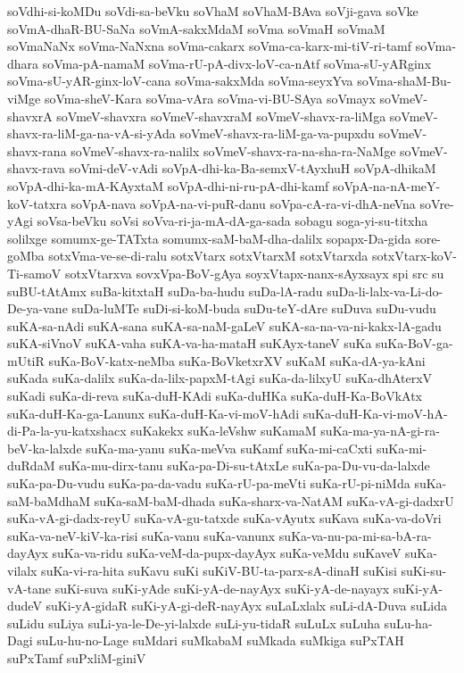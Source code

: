 {soVdhi-si-koMDu
soVdi-sa-beVku
soVhaM
soVhaM-BAva
soVji-gava
soVke
soVmA-dhaR-BU-SaNa
soVmA-sakxMdaM
soVma
soVmaH
soVmaM
soVmaNaNx
soVma-NaNxna
soVma-cakarx
soVma-ca-karx-mi-tiV-ri-tamf
soVma-dhara
soVma-pA-namaM
soVma-rU-pA-divx-loV-ca-nAtf
soVma-sU-yARginx
soVma-sU-yAR-ginx-loV-cana
soVma-sakxMda
soVma-seyxYva
soVma-shaM-Bu-viMge
soVma-sheV-Kara
soVma-vAra
soVma-vi-BU-SAya
soVmayx
soVmeV-shavxrA
soVmeV-shavxra
soVmeV-shavxraM
soVmeV-shavx-ra-liMga
soVmeV-shavx-ra-liM-ga-na-vA-si-yAda
soVmeV-shavx-ra-liM-ga-va-pupxdu
soVmeV-shavx-rana
soVmeV-shavx-ra-nalilx
soVmeV-shavx-ra-na-sha-ra-NaMge
soVmeV-shavx-rava
soVmi-deV-vAdi
soVpA-dhi-ka-Ba-semxV-tAyxhuH
soVpA-dhikaM
soVpA-dhi-ka-mA-KAyxtaM
soVpA-dhi-ni-ru-pA-dhi-kamf
soVpA-na-nA-meY-koV-tatxra
soVpA-nava
soVpA-na-vi-puR-danu
soVpa-cA-ra-vi-dhA-neVna
soVre-yAgi
soVsa-beVku
soVsi
soVva-ri-ja-mA-dA-ga-sada
sobagu
soga-yi-su-titxha
solilxge
somumx-ge-TATxta
somumx-saM-baM-dha-dalilx
sopapx-Da-gida
sore-goMba
sotxVma-ve-se-di-ralu
sotxVtarx
sotxVtarxM
sotxVtarxda
sotxVtarx-koV-Ti-samoV
sotxVtarxva
sovxVpa-BoV-gAya
soyxVtapx-nanx-sAyxsayx
spi
src
su
suBU-tAtAmx
suBa-kitxtaH
suDa-ba-hudu
suDa-lA-radu
suDa-li-lalx-va-Li-do-De-ya-vane
suDa-luMTe
suDi-si-koM-buda
suDu-teY-dAre
suDuva
suDu-vudu
suKA-sa-nAdi
suKA-sana
suKA-sa-naM-gaLeV
suKA-sa-na-va-ni-kakx-lA-gadu
suKA-siVnoV
suKA-vaha
suKA-va-ha-mataH
suKAyx-taneV
suKa
suKa-BoV-ga-mUtiR
suKa-BoV-katx-neMba
suKa-BoVketxrXV
suKaM
suKa-dA-ya-kAni
suKada
suKa-dalilx
suKa-da-lilx-papxM-tAgi
suKa-da-lilxyU
suKa-dhAterxV
suKadi
suKa-di-reva
suKa-duH-KAdi
suKa-duHKa
suKa-duH-Ka-BoVkAtx
suKa-duH-Ka-ga-Lanunx
suKa-duH-Ka-vi-moV-hAdi
suKa-duH-Ka-vi-moV-hA-di-Pa-la-yu-katxshacx
suKakekx
suKa-leVshw
suKamaM
suKa-ma-ya-nA-gi-ra-beV-ka-lalxde
suKa-ma-yanu
suKa-meVva
suKamf
suKa-mi-caCxti
suKa-mi-duRdaM
suKa-mu-dirx-tanu
suKa-pa-Di-su-tAtxLe
suKa-pa-Du-vu-da-lalxde
suKa-pa-Du-vudu
suKa-pa-da-vadu
suKa-rU-pa-meVti
suKa-rU-pi-niMda
suKa-saM-baMdhaM
suKa-saM-baM-dhada
suKa-sharx-va-NatAM
suKa-vA-gi-dadxrU
suKa-vA-gi-dadx-reyU
suKa-vA-gu-tatxde
suKa-vAyutx
suKava
suKa-va-doVri
suKa-va-neV-kiV-ka-risi
suKa-vanu
suKa-vanunx
suKa-va-nu-pa-mi-sa-bA-ra-dayAyx
suKa-va-ridu
suKa-veM-da-pupx-dayAyx
suKa-veMdu
suKaveV
suKa-vilalx
suKa-vi-ra-hita
suKavu
suKi
suKiV-BU-ta-parx-sA-dinaH
suKisi
suKi-su-vA-tane
suKi-suva
suKi-yAde
suKi-yA-de-nayAyx
suKi-yA-de-nayayx
suKi-yA-dudeV
suKi-yA-gidaR
suKi-yA-gi-deR-nayAyx
suLaLxlalx
suLi-dA-Duva
suLida
suLidu
suLiya
suLi-ya-le-De-yi-lalxde
suLi-yu-tidaR
suLuLx
suLuha
suLu-ha-Dagi
suLu-hu-no-Lage
suMdari
suMkabaM
suMkada
suMkiga
suPxTAH
suPxTamf
suPxliM-giniV
}
